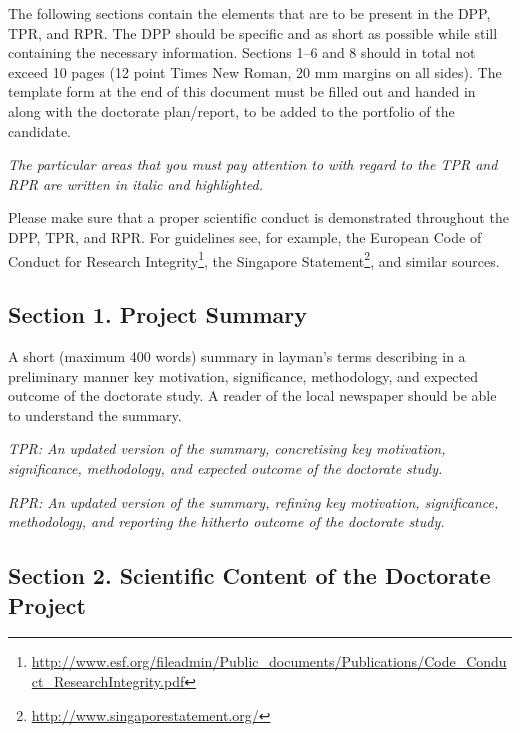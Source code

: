 \documentclass[12pt]{article}
\begin{document}
The following sections contain the elements that are to be present in the DPP, TPR, and RPR. The DPP should be specific and as short as possible while still containing the necessary information. Sections 1--6 and 8 should in total not exceed 10 pages (12 point Times New Roman, 20 mm margins on all sides).
The template form at the end of this document must be filled out and handed in along with the doctorate plan/report, to be added to the portfolio of the candidate.
\begin{shaded}
\noindent
\emph{The particular areas that you must pay attention to with regard to the TPR and RPR are written in italic and highlighted.}
\end{shaded}

Please make sure that a proper scientific conduct is demonstrated throughout the DPP, TPR, and RPR. For guidelines see, for example, the European Code of Conduct for Research Integrity\footnote{\url{http://www.esf.org/fileadmin/Public_documents/Publications/Code_Conduct_ResearchIntegrity.pdf}}, the Singapore Statement\footnote{\url{http://www.singaporestatement.org/}}, and similar sources.

\subsection*{Section 1. Project Summary}

A short (maximum 400 words) summary in layman's terms describing in a preliminary manner key motivation, significance, methodology, and expected outcome of the doctorate study. A reader of the local newspaper should be able to understand the summary.

\begin{shaded}
\noindent
\emph{TPR: An updated version of the summary, concretising key motivation, significance, methodology, and expected outcome of the doctorate study.}

\noindent
\emph{RPR: An updated version of the summary, refining key motivation, significance, methodology, and reporting the hitherto outcome of the doctorate study.}
\end{shaded}

\subsection*{Section 2. Scientific Content of the Doctorate Project}
\end{document}
